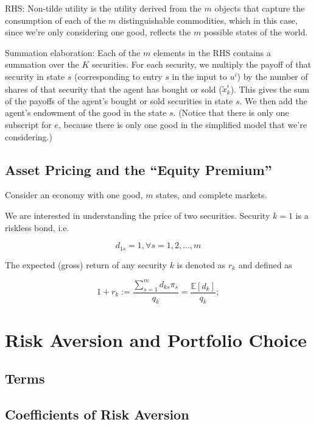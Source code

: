\documentclass[10pt]{article}
\begin{document}
RHS: Non-tilde utility is the utility derived from the 
$m$ objects that capture the consumption of each of the 
$m$ distinguishable commodities, which in this case, since 
we're only considering one good,
reflects the $m$ possible states of the world.

Summation elaboration: Each of the $m$ elements in the RHS 
contains a summation over the $K$ securities. For each security, 
we multiply the payoff of that security in state $s$ (corresponding 
to entry $s$ in the input to $u^i$) by the number of shares 
of that security that the agent has bought or sold ($\tilde{x}_k^i$).
This gives the sum of the payoffs of the agent's bought or sold
securities in state $s$. We then add the agent's endowment
of the good in the state $s$. (Notice that there is only one subscript for $e$,
because there is only one good in the simplified model that we're 
considering.)

\subsection{Asset Pricing and the ``Equity Premium''}

Consider an economy with one good, $m$ states, and complete markets.

We are interested in understanding the price of two securities. Security $k=1$ is a riskless bond, i.e.

$$
d_{1 s}=1, \forall s=1,2, \ldots, m
$$

\begin{definition} 
    The expected (gross) return of any security $k$ is denoted as $r_k$ and defined as

    $$
    1+r_k:=\frac{\sum_{s=1}^m d_{k s} \pi_s}{q_k}=\frac{\mathbb{E}\left[d_k\right]}{q_k} ;
    $$
\end{definition}

\section{Risk Aversion and Portfolio Choice}

\subsection{Terms}



\subsection{Coefficients of Risk Aversion}
\end{document}
